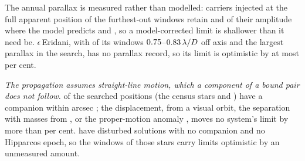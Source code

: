 The annual parallax is measured rather than modelled: carriers injected at
the full apparent position of the \SensNReextWin{} furthest-out windows
retain \SensPxSmallMeas{} and \SensPxLargeMeas{} of their amplitude where the
model predicts \SensPxSmallPred{} and \SensPxLargePred, so a model-corrected
limit is shallower than it need be. $\epsilon$\,Eridani, with \BmEpsNOff{} of its
\BmEpsNWin{} windows $0.75$--$0.83\,\lambda/D$ off axis and the
largest parallax in the search, has no parallax record, so its limit is
optimistic by at most \BmEpsPxBoundPct{} per cent.

\emph{The propagation assumes straight-line motion, which a component of a
bound pair does not follow.} \OmNComponent{} of the \OmNStar{} searched
positions (the \OmNCensusStar{} census stars and \OmXStar) have a companion
within \OmRadius{} arcsec \citep{wds,orb6}; the displacement, from a visual
orbit, the separation with masses from \citet{pecaut2013}, or the
proper-motion anomaly \citep{kervella2022}, moves no system's limit by more
than \OmSysMovedMaxPct{} per cent. \OmFlagStars{} have disturbed solutions
with no companion and no Hipparcos epoch, so the \OmNWinFlag{} windows of
those \OmNFlag{} stars carry limits optimistic by an unmeasured amount.

\begin{table}
\centering
\scriptsize
\caption{\textbf{The survey ledger, part one: execution blocks and windows.}
Each row carries its own number, and a group sums to the row whose number
heads it. Hours are window-hours, so the classes partition the hours as they
partition the windows. Rows~3.2 to 3.5 are the archival gap, over which no
result is formed.}
\label{tab:blockledger}

\end{table}

